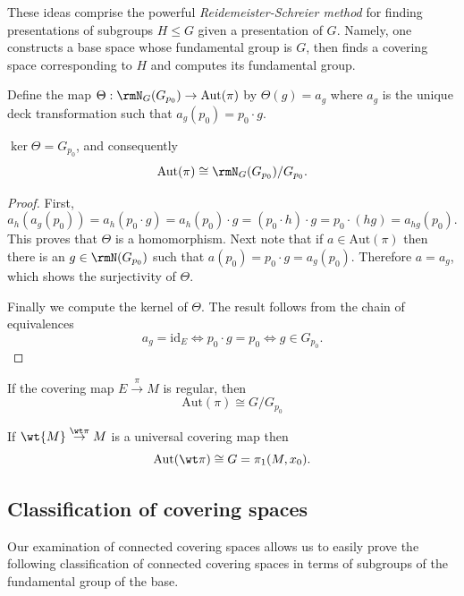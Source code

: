 \begin{rem}
    These ideas comprise the powerful \emph{Reidemeister-Schreier method} for finding presentations of subgroups $H\leq G$ given a presentation of $G$. Namely, one constructs a base space whose fundamental group is $G$, then finds a covering space corresponding to $H$ and computes its fundamental group.
\end{rem}

\begin{defn}
    Define the map $\Theta:\rmN_G(G_{p_0})\to \mathrm{Aut}(\pi)$ by $\Theta(g)=a_g$ where $a_g$ is the unique deck transformation such that $a_g(p_0)=p_0\cdot g$.
\end{defn}
\begin{thm}\label{thm 6.8 Bredon}
    $\ker \Theta=G_{p_0}$, and consequently
    \[\mathrm{Aut}(\pi)\cong \rmN_G(G_{p_0})\slash G_{p_0}.\]
\end{thm}
\begin{proof}
    First, 
    \[a_h(a_g(p_0))=a_h(p_0\cdot g)=a_h(p_0)\cdot g=(p_0\cdot h)\cdot g=p_0\cdot (hg)=a_{hg}(p_0).\]
    This proves that $\Theta$ is a homomorphism. Next note that if $a\in \mathrm{Aut}(\pi)$ then there is an $g\in \rmN(G_{p_0})$ such that $a(p_0)=p_0\cdot g=a_g(p_0)$. Therefore $a=a_g$, which shows the surjectivity of $\Theta$.

    Finally we compute the kernel of $\Theta$. The result follows from the chain of equivalences
    \[a_g=\mathrm{id}_E \Leftrightarrow p_0\cdot g=p_0\Leftrightarrow g\in G_{p_0}.\]
\end{proof}
\begin{cor}
    If the covering map $E\overset{\pi}{\to} M$ is regular, then 
    \[\mathrm{Aut}(\pi)\cong G/G_{p_0}\]
\end{cor}
\begin{cor}
    If $\wt{M}\overset{\wt\pi}{\to} M$ is a universal covering map then
    \[\mathrm{Aut}(\wt\pi)\cong G=\pi_1(M,x_0).\]
\end{cor}



\subsection{Classification of covering spaces}

Our examination of connected covering spaces allows us to easily prove the following classification of connected covering spaces in terms of subgroups of the fundamental group of the base.

